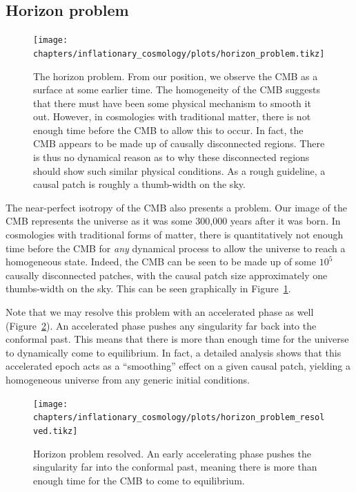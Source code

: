 \subsection{Horizon problem}
\begin{figure}[tp]
  \centering
  \texttt{[image: chapters/inflationary\_cosmology/plots/horizon\_problem.tikz]}
  \caption{The horizon problem. From our position, we observe the CMB as a surface at some earlier time. The homogeneity of the CMB suggests that there must have been some physical mechanism to smooth it out. However, in cosmologies with traditional matter, there is not enough time before the CMB to allow this to occur. In fact, the CMB appears to be made up of causally disconnected regions. There is thus no dynamical reason as to why these disconnected regions should show such similar physical conditions. As a rough guideline, a causal patch is roughly a thumb-width on the sky.}\label{fig:cos:horizon_problem}
\end{figure}
The near-perfect isotropy of the CMB also presents a problem. Our image of the CMB represents the universe as it was some 300,000 years after it was born. In cosmologies with traditional forms of matter, there is quantitatively not enough time before the CMB for {\em any\/} dynamical process to allow the universe to reach a homogeneous state. Indeed, the CMB can be seen to be made up of some $10^{5}$ causally disconnected patches, with the causal patch size approximately one thumbs-width on the sky. This can be seen graphically in Figure~\ref{fig:cos:horizon_problem}.

Note that we may resolve this problem with an accelerated phase as well (Figure~\ref{fig:cos:horizon_problem_resolved}). An accelerated phase pushes any singularity far back into the conformal past. This means that there is more than enough time for the universe to dynamically come to equilibrium. In fact, a detailed analysis shows that this accelerated epoch acts as a ``smoothing'' effect on a given causal patch, yielding a homogeneous universe from any generic initial conditions.


\begin{figure}[tp]
  \centering
  \texttt{[image: chapters/inflationary\_cosmology/plots/horizon\_problem\_resolved.tikz]}
  \caption{Horizon problem resolved. An early accelerating phase pushes the singularity far into the conformal past, meaning there is more than enough time for the CMB to come to equilibrium.\label{fig:cos:horizon_problem_resolved}}
\end{figure}

